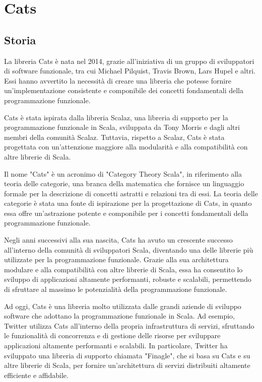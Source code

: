 \chapter{Cats}

\section{Storia}
La libreria Cats è nata nel 2014, grazie all'iniziativa di un gruppo di sviluppatori di software funzionale, tra cui Michael Pilquist, Travis Brown, Lars Hupel e altri. Essi hanno avvertito la necessità di creare una libreria che potesse fornire un'implementazione consistente e componibile dei concetti fondamentali della programmazione funzionale.

\noindent Cats è stata ispirata dalla libreria Scalaz, una libreria di supporto per la programmazione funzionale in Scala, sviluppata da Tony Morris e dagli altri membri della comunità Scalaz. Tuttavia, rispetto a Scalaz, Cats è stata progettata con un'attenzione maggiore alla modularità e alla compatibilità con altre librerie di Scala.

\noindent Il nome "Cats" è un acronimo di "Category Theory Scala", in riferimento alla teoria delle categorie, una branca della matematica che fornisce un linguaggio formale per la descrizione di concetti astratti e relazioni tra di essi. La teoria delle categorie è stata una fonte di ispirazione per la progettazione di Cats, in quanto essa offre un'astrazione potente e componibile per i concetti fondamentali della programmazione funzionale.

\noindent Negli anni successivi alla sua nascita, Cats ha avuto un crescente successo all'interno della comunità di sviluppatori Scala, diventando una delle librerie più utilizzate per la programmazione funzionale. Grazie alla sua architettura modulare e alla compatibilità con altre librerie di Scala, essa ha consentito lo sviluppo di applicazioni altamente performanti, robuste e scalabili, permettendo di sfruttare al massimo le potenzialità della programmazione funzionale.

\noindent Ad oggi, Cats è una libreria molto utilizzata dalle grandi aziende di sviluppo software che adottano la programmazione funzionale in Scala. Ad esempio, Twitter utilizza Cats all'interno della propria infrastruttura di servizi, sfruttando le funzionalità di concorrenza e di gestione delle risorse per sviluppare applicazioni altamente performanti e scalabili. In particolare, Twitter ha sviluppato una libreria di supporto chiamata "Finagle", che si basa su Cats e su altre librerie di Scala, per fornire un'architettura di servizi distribuiti altamente efficiente e affidabile.

